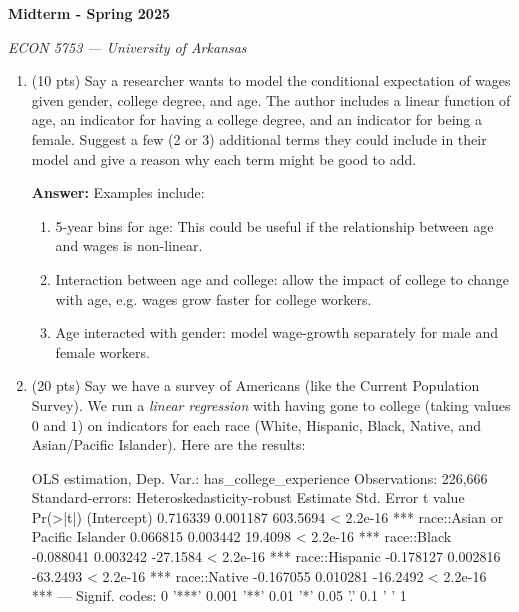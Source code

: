 \documentclass[12pt]{article}
\newcommand{\answer}[1]{{\color{blue_winged_teal}\textbf{Answer:} #1}}
\newcommand{\pts}[1]{{\color{zinc500}(#1 pts)}}
\begin{document}
\begin{center}
  {\Huge\bf Midterm - Spring 2025}
  
  \smallskip
  {\large\it ECON 5753 — University of Arkansas}
\end{center}

\medskip
\begin{enumerate}
  \item \pts{10} Say a researcher wants to model the conditional expectation of wages given gender, college degree, and age. The author includes a linear function of age, an indicator for having a college degree, and an indicator for being a female. Suggest a few (2 or 3) additional terms they could include in their model and give a reason why each term might be good to add. 
  
  \answer{
    Examples include: 
    \begin{enumerate}
      \item 5-year bins for age: This could be useful if the relationship between age and wages is non-linear.
      
      \item Interaction between age and college: allow the impact of college to change with age, e.g. wages grow faster for college workers.
      
      \item Age interacted with gender: model wage-growth separately for male and female workers.
    \end{enumerate}
  }

  \bigskip
  \item \pts{20} Say we have a survey of Americans (like the Current Population Survey). We run a \emph{linear regression} with having gone to college (taking values $0$ and $1$) on indicators for each race (White, Hispanic, Black, Native, and Asian/Pacific Islander). Here are the results:
  \begin{codeblock}[{}]
OLS estimation, Dep. Var.: has_college_experience
Observations: 226,666
Standard-errors: Heteroskedasticity-robust 
                                 Estimate Std. Error  t value  Pr(>|t|)    
(Intercept)                      0.716339   0.001187 603.5694 < 2.2e-16 ***
race::Asian or Pacific Islander  0.066815   0.003442  19.4098 < 2.2e-16 ***
race::Black                     -0.088041   0.003242 -27.1584 < 2.2e-16 ***
race::Hispanic                  -0.178127   0.002816 -63.2493 < 2.2e-16 ***
race::Native                    -0.167055   0.010281 -16.2492 < 2.2e-16 ***
---
Signif. codes:  0 '***' 0.001 '**' 0.01 '*' 0.05 '.' 0.1 ' ' 1
  \end{codeblock}


\end{enumerate}
\end{document}
